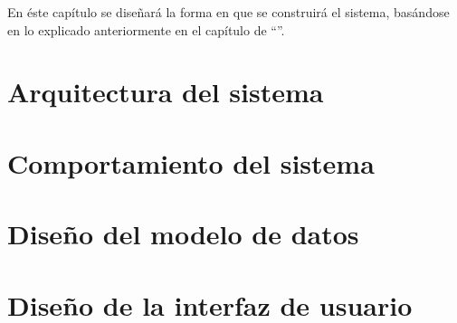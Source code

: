 En éste capítulo se diseñará la forma en que se construirá el sistema, basándose en lo explicado anteriormente en el capítulo de ``''.

\section{Arquitectura del sistema}
\label{arquitectura_sistema}


\section{Comportamiento del sistema}
\label{comportamiento_sistema}


\section{Diseño del modelo de datos}
\label{diseno_modelo_datos}


\section{Diseño de la interfaz de usuario}
\label{diseno_interfaz_usuario}
